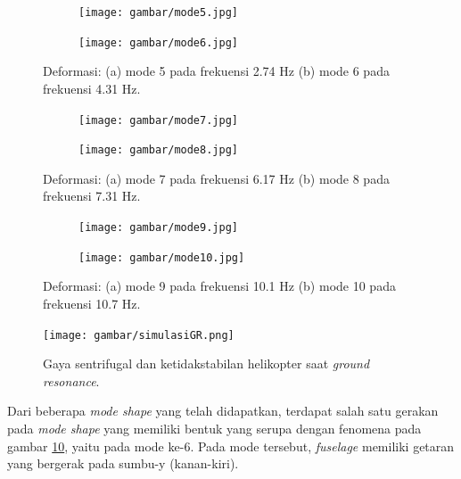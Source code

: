 \begin{figure}[H]
	\begin{subfigure}{0.49\textwidth}
		\centering
		\texttt{[image: gambar/mode5.jpg]}
		\caption{}
		\label{fig:mode5}
	\end{subfigure}
	\centering
	\begin{subfigure}{0.49\textwidth}
		\centering
		\texttt{[image: gambar/mode6.jpg]}
		\caption{}
		\label{fig:mode6}
	\end{subfigure}
	\caption{Deformasi: (a) mode 5 pada frekuensi 2.74 Hz (b) mode 6 pada frekuensi 4.31 Hz.}
\end{figure}

\begin{figure}[H]
	\begin{subfigure}{0.49\textwidth}
		\centering
		\texttt{[image: gambar/mode7.jpg]}
		\caption{}
		\label{fig:mode7}
	\end{subfigure}
	\centering
	\begin{subfigure}{0.49\textwidth}
		\centering
		\texttt{[image: gambar/mode8.jpg]}
		\caption{}
		\label{fig:mode8}
	\end{subfigure}
	\caption{Deformasi: (a) mode 7 pada frekuensi 6.17 Hz (b) mode 8 pada frekuensi 7.31 Hz.}
\end{figure}

\begin{figure}[H]
	\begin{subfigure}{0.49\textwidth}
		\centering
		\texttt{[image: gambar/mode9.jpg]}
		\caption{}
		\label{fig:mode9}
	\end{subfigure}
	\centering
	\begin{subfigure}{0.49\textwidth}
		\centering
		\texttt{[image: gambar/mode10.jpg]}
		\caption{}
		\label{fig:mode10}
	\end{subfigure}
	\caption{Deformasi: (a) mode 9 pada frekuensi 10.1 Hz (b) mode 10 pada frekuensi 10.7 Hz.}
	\label{fig:modeshape10}
\end{figure}

\begin{figure}[H]
	\centering
	\texttt{[image: gambar/simulasiGR.png]}
	\caption{Gaya sentrifugal dan ketidakstabilan helikopter saat \textit{ground resonance}.}
	\label{fig:simulasiGR}
\end{figure}

Dari beberapa \textit{mode shape} yang telah didapatkan, terdapat salah satu gerakan pada \textit{mode shape} yang memiliki bentuk yang serupa dengan fenomena pada gambar \ref{fig:simulasiGR}, yaitu pada mode ke-6. Pada mode tersebut, \textit{fuselage} memiliki getaran yang bergerak pada sumbu-y (kanan-kiri).

